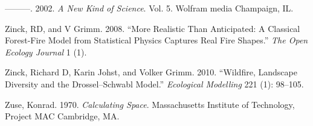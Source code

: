 \documentclass[
]{book}
\newlength{\cslhangindent}
\newenvironment{cslreferences}%
  {\setlength{\parindent}{0pt}%
  \everypar{\setlength{\hangindent}{\cslhangindent}}\ignorespaces}%
  {\par}
\begin{document}
\begin{cslreferences}
\leavevmode\hypertarget{ref-wolfram2002new}{}%
---------. 2002. \emph{A New Kind of Science}. Vol. 5. Wolfram media Champaign, IL.

\leavevmode\hypertarget{ref-zinck2008more}{}%
Zinck, RD, and V Grimm. 2008. ``More Realistic Than Anticipated: A Classical Forest-Fire Model from Statistical Physics Captures Real Fire Shapes.'' \emph{The Open Ecology Journal} 1 (1).

\leavevmode\hypertarget{ref-zinck2010wildfire}{}%
Zinck, Richard D, Karin Johst, and Volker Grimm. 2010. ``Wildfire, Landscape Diversity and the Drossel--Schwabl Model.'' \emph{Ecological Modelling} 221 (1): 98--105.

\leavevmode\hypertarget{ref-zuse1970calculating}{}%
Zuse, Konrad. 1970. \emph{Calculating Space}. Massachusetts Institute of Technology, Project MAC Cambridge, MA.
\end{cslreferences}
\end{document}
